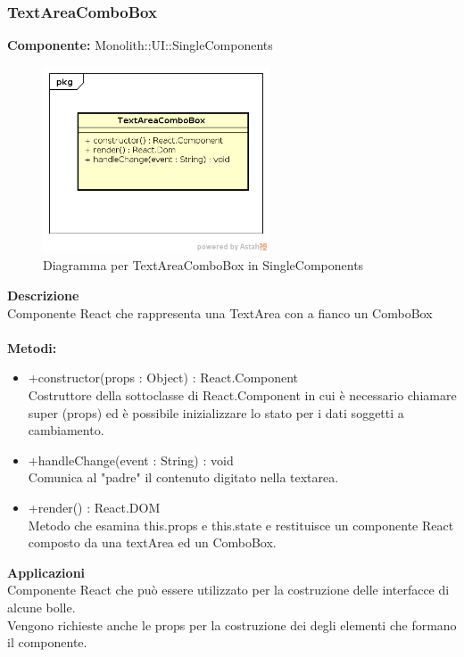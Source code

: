 \clearpage

\subsubsection{TextAreaComboBox}
\textbf{Componente:}  Monolith::UI::SingleComponents\\
   \FloatBarrier
   \begin{figure}[ht]
   \centering
   \includegraphics[width=0.6\textwidth]{img/single-TextAreaComboBox}
   \caption{{Diagramma per TextAreaComboBox in SingleComponents}}
\end{figure}
\FloatBarrier
\textbf{Descrizione}\\
Componente React che rappresenta una TextArea con a fianco un ComboBox \\\\
\textbf{Metodi:} 
\begin{itemize}

\item +constructor(props : Object) : React.Component 
\\
Costruttore della sottoclasse di React.Component in cui è necessario chiamare super (props) ed è possibile inizializzare lo stato per i dati soggetti a cambiamento.

\item +handleChange(event : String) : void  
\\ 
Comunica al "padre" il contenuto digitato nella textarea.

\item +render() : React.DOM 
\\
Metodo che esamina this.props e this.state e restituisce un componente React composto da una textArea ed un ComboBox.

\end{itemize} 


\textbf{Applicazioni}\\
Componente React che può essere utilizzato per la costruzione delle interfacce di alcune bolle.
\\ Vengono richieste anche le props per la costruzione dei degli elementi che formano il componente. 


